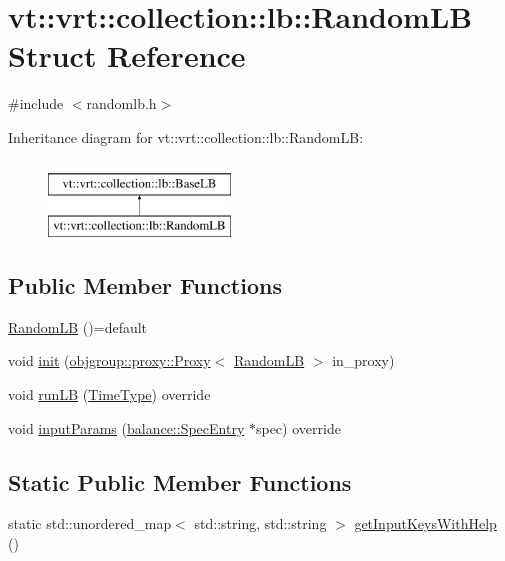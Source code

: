 \hypertarget{structvt_1_1vrt_1_1collection_1_1lb_1_1_random_l_b}{}\section{vt\+:\+:vrt\+:\+:collection\+:\+:lb\+:\+:Random\+LB Struct Reference}
\label{structvt_1_1vrt_1_1collection_1_1lb_1_1_random_l_b}


{\ttfamily \#include $<$randomlb.\+h$>$}

Inheritance diagram for vt\+:\+:vrt\+:\+:collection\+:\+:lb\+:\+:Random\+LB\+:\begin{figure}[H]
\begin{center}
\leavevmode
\includegraphics[height=2.000000cm]{structvt_1_1vrt_1_1collection_1_1lb_1_1_random_l_b}
\end{center}
\end{figure}
\subsection*{Public Member Functions}
\begin{DoxyCompactItemize}
\item 
\hyperlink{structvt_1_1vrt_1_1collection_1_1lb_1_1_random_l_b_ac6bf4ed6fb55fb787478c5f00d68f20c}{Random\+LB} ()=default
\item 
void \hyperlink{structvt_1_1vrt_1_1collection_1_1lb_1_1_random_l_b_a1b9a24043e9a971fc3acb47233028ca8}{init} (\hyperlink{structvt_1_1objgroup_1_1proxy_1_1_proxy}{objgroup\+::proxy\+::\+Proxy}$<$ \hyperlink{structvt_1_1vrt_1_1collection_1_1lb_1_1_random_l_b}{Random\+LB} $>$ in\+\_\+proxy)
\item 
void \hyperlink{structvt_1_1vrt_1_1collection_1_1lb_1_1_random_l_b_a307d5e63c39550c4ab79e5a770b0c9fb}{run\+LB} (\hyperlink{namespacevt_a876a9d0cd5a952859c72de8a46881442}{Time\+Type}) override
\item 
void \hyperlink{structvt_1_1vrt_1_1collection_1_1lb_1_1_random_l_b_ae0269a00daa9a3111742d9ea35f5a542}{input\+Params} (\hyperlink{structvt_1_1vrt_1_1collection_1_1balance_1_1_spec_entry}{balance\+::\+Spec\+Entry} $\ast$spec) override
\end{DoxyCompactItemize}
\subsection*{Static Public Member Functions}
\begin{DoxyCompactItemize}
\item 
static std\+::unordered\+\_\+map$<$ std\+::string, std\+::string $>$ \hyperlink{structvt_1_1vrt_1_1collection_1_1lb_1_1_random_l_b_a82f4963022fe65edd8dcd30e53525e07}{get\+Input\+Keys\+With\+Help} ()
\end{DoxyCompactItemize}
